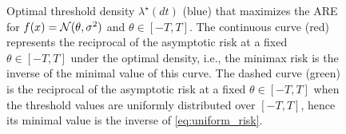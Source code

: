 \begin{figure}
\begin{center}







\caption{\label{fig:minimax_support}
Optimal threshold density $\lambda^\star(dt)$ (blue) that maximizes the ARE for $f(x) = \mathcal{N}(\theta,\sigma^2)$ and $\theta \in [-T,T]$.
%
The continuous curve (red) represents the reciprocal of the asymptotic risk at a fixed $\theta \in [-T,T]$ under the optimal density, i.e., the minimax risk is the inverse of the minimal value of this curve. The dashed curve (green) is the reciprocal of the asymptotic risk at a fixed $\theta \in [-T,T]$ when the threshold values are uniformly distributed over $[-T,T]$, hence its minimal value is the inverse of \eqref{eq:uniform_risk}. }
\end{center}
\end{figure}


